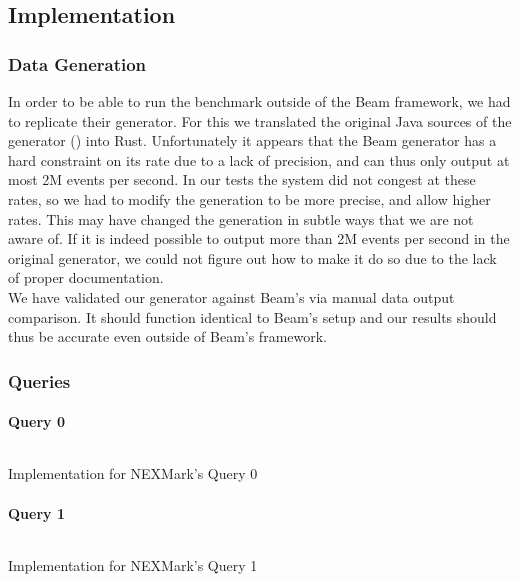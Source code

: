 \subsection{Implementation}
\subsubsection{Data Generation}
In order to be able to run the benchmark outside of the Beam framework, we had to replicate their generator. For this we translated the original Java sources of the generator () into Rust. Unfortunately it appears that the Beam generator has a hard constraint on its rate due to a lack of precision, and can thus only output at most 2M events per second. In our tests the system did not congest at these rates, so we had to modify the generation to be more precise, and allow higher rates. This may have changed the generation in subtle ways that we are not aware of. If it is indeed possible to output more than 2M events per second in the original generator, we could not figure out how to make it do so due to the lack of proper documentation. \\

We have validated our generator against Beam's via manual data output comparison. It should function identical to Beam's setup and our results should thus be accurate even outside of Beam's framework.

\subsubsection{Queries}
\paragraph{Query 0}
\begin{listing}[H]
  \inputminted[firstline=400,lastline=400]{rust}{benchmarks/src/nexmark.rs}
  \caption{Implementation for NEXMark's Query 0}
  \label{lst:nexmark-query0}
\end{listing}

\paragraph{Query 1}\label{sec:query1}
\begin{listing}[H]
  \inputminted[firstline=425,lastline=427]{rust}{benchmarks/src/nexmark.rs}
  \caption{Implementation for NEXMark's Query 1}
  \label{lst:nexmark-query1}
\end{listing}

